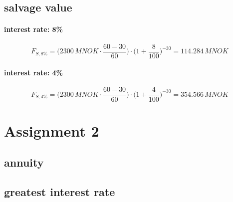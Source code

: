 \documentclass{article}
\begin{document}
\subsection{salvage value}
\paragraph{interest rate: 8\%\\}
$$F_{S,8\%}=\bigg(2300\,MNOK\cdot\frac{60-30}{60}\bigg)\cdot\bigg(1+\frac{8}{100}\bigg)^{-30}=114.284\,MNOK$$
\paragraph{interest rate: 4\%\\}
$$F_{S,4\%}=\bigg(2300\,MNOK\cdot\frac{60-30}{60}\bigg)\cdot\bigg(1+\frac{4}{100}\bigg)^{-30}=354.566\,MNOK$$
\section{Assignment 2}
\subsection{annuity}
\subsection{greatest interest rate}
\end{document}
